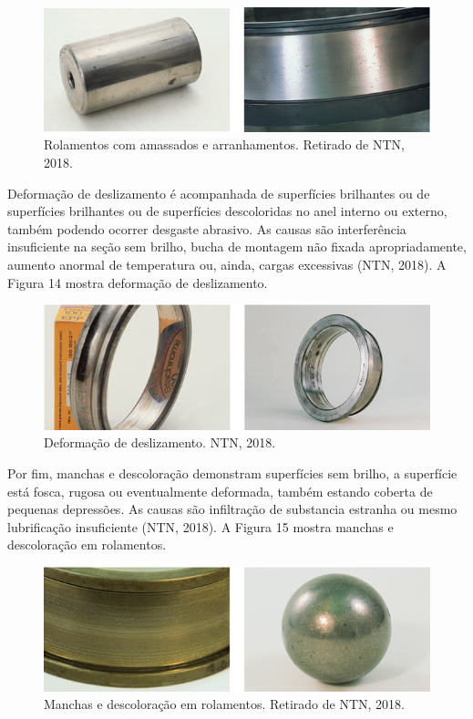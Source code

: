\documentclass[
	12pt,				
	oneside,			
	a4paper,			
	english,			
	brazil				
	]{abntex2ppgsi}
\begin{document}
\begin{figure}[!htb]
\centering
\includegraphics{Figura13}
\caption {Rolamentos com amassados e arranhamentos. Retirado de NTN, 2018.}
\label{Figura13}
\end{figure}

Deformação de deslizamento é acompanhada de superfícies brilhantes ou de superfícies brilhantes ou de superfícies descoloridas no anel interno ou externo, também podendo ocorrer desgaste abrasivo. As causas são interferência insuficiente na seção sem brilho, bucha de montagem não fixada apropriadamente, aumento anormal de temperatura ou, ainda, cargas excessivas (NTN, 2018). A Figura 14 mostra deformação de deslizamento.

\begin{figure}[!htb]
\centering
\includegraphics{Figura14}
\caption {Deformação de deslizamento. NTN, 2018.}
\label{Figura14}
\end{figure}

Por fim, manchas e descoloração demonstram superfícies sem brilho, a superfície está fosca, rugosa ou eventualmente deformada, também estando coberta de pequenas depressões. As causas são infiltração de substancia estranha ou mesmo lubrificação insuficiente (NTN, 2018). A Figura 15 mostra manchas e descoloração em rolamentos.

\begin{figure}[!htb]
\centering
\includegraphics{Figura15}
\caption {Manchas e descoloração em rolamentos. Retirado de NTN, 2018.}
\label{Figura15}
\end{figure}
\end{document}
